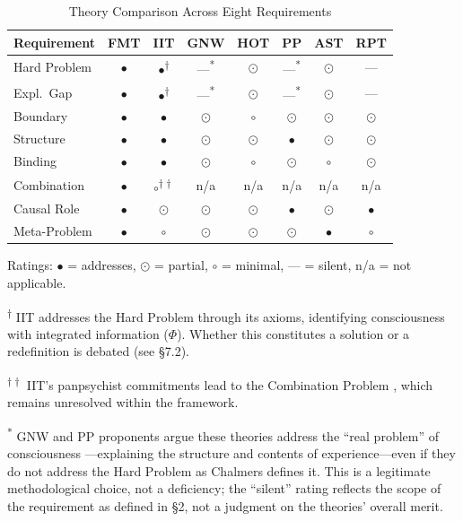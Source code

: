 \documentclass[12pt]{article}
\begin{document}
\begin{table}[htbp]
\centering
\caption{Theory Comparison Across Eight Requirements}
\label{tab:comparison}
\small
\renewcommand{\arraystretch}{1.4}
\begin{tabularx}{\textwidth}{>{\raggedright}p{2cm} c c c c c c c}
\toprule
\textbf{Requirement} & \textbf{FMT} & \textbf{IIT} & \textbf{GNW} & \textbf{HOT} & \textbf{PP} & \textbf{AST} & \textbf{RPT} \\
\midrule
Hard Problem & $\bullet$ & $\bullet$\textsuperscript{$\dagger$} & ---\textsuperscript{*} & $\odot$ & ---\textsuperscript{*} & $\odot$ & --- \\
Expl.\ Gap & $\bullet$ & $\bullet$\textsuperscript{$\dagger$} & ---\textsuperscript{*} & $\odot$ & ---\textsuperscript{*} & $\odot$ & --- \\
Boundary & $\bullet$ & $\bullet$ & $\odot$ & $\circ$ & $\odot$ & $\odot$ & $\odot$ \\
Structure & $\bullet$ & $\bullet$ & $\odot$ & $\odot$ & $\bullet$ & $\odot$ & $\odot$ \\
Binding & $\bullet$ & $\bullet$ & $\odot$ & $\circ$ & $\odot$ & $\circ$ & $\odot$ \\
Combination & $\bullet$ & $\circ$\textsuperscript{$\dagger\dagger$} & n/a & n/a & n/a & n/a & n/a \\
Causal Role & $\bullet$ & $\odot$ & $\odot$ & $\odot$ & $\bullet$ & $\odot$ & $\bullet$ \\
Meta-Problem & $\bullet$ & $\circ$ & $\odot$ & $\odot$ & $\odot$ & $\bullet$ & $\circ$ \\
\bottomrule
\end{tabularx}

\vspace{0.5em}
\footnotesize
Ratings: $\bullet$ = addresses, $\odot$ = partial, $\circ$ = minimal, --- = silent, n/a = not applicable.

\textsuperscript{$\dagger$} IIT addresses the Hard Problem through its axioms, identifying consciousness with integrated information ($\Phi$). Whether this constitutes a solution or a redefinition is debated (see \S7.2).

\textsuperscript{$\dagger\dagger$} IIT's panpsychist commitments lead to the Combination Problem \citep{Chalmers2016}, which remains unresolved within the framework.

\textsuperscript{*} GNW and PP proponents argue these theories address the ``real problem'' of consciousness \citep{Seth2021}---\hspace{0pt}explaining the structure and contents of experience---\hspace{0pt}even if they do not address the Hard Problem as Chalmers defines it. This is a legitimate methodological choice, not a deficiency; the ``silent'' rating reflects the scope of the requirement as defined in \S2, not a judgment on the theories' overall merit.
\end{table}
\end{document}
